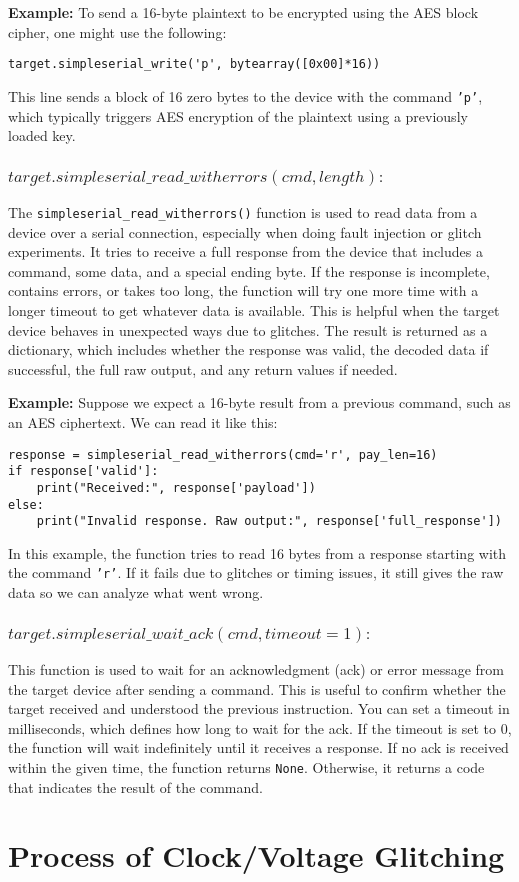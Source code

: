 \vspace{0.3cm}
\noindent
\textbf{Example:} To send a 16-byte plaintext to be encrypted using the AES block cipher, one might use the following:

\begin{verbatim}
target.simpleserial_write('p', bytearray([0x00]*16))
\end{verbatim}

This line sends a block of 16 zero bytes to the device with the command \texttt{'p'}, which typically triggers AES encryption of the plaintext using a previously loaded key.

\subsubsection{$target.simpleserial\_read\_witherrors(cmd, length) :$}
The \texttt{simpleserial\_read\_witherrors()} function is used to read data from a device over a serial connection, especially when doing fault injection or glitch experiments. It tries to receive a full response from the device that includes a command, some data, and a special ending byte. If the response is incomplete, contains errors, or takes too long, the function will try one more time with a longer timeout to get whatever data is available. This is helpful when the target device behaves in unexpected ways due to glitches. The result is returned as a dictionary, which includes whether the response was valid, the decoded data if successful, the full raw output, and any return values if needed.

\vspace{0.3cm}
\noindent
\textbf{Example:} Suppose we expect a 16-byte result from a previous command, such as an AES ciphertext. We can read it like this:

\begin{verbatim}
response = simpleserial_read_witherrors(cmd='r', pay_len=16)
if response['valid']:
    print("Received:", response['payload'])
else:
    print("Invalid response. Raw output:", response['full_response'])
\end{verbatim}

In this example, the function tries to read 16 bytes from a response starting with the command \texttt{'r'}. If it fails due to glitches or timing issues, it still gives the raw data so we can analyze what went wrong.

\subsubsection{$target.simpleserial\_wait\_ack(cmd, timeout=1) :$}
This function is used to wait for an acknowledgment (ack) or error message from the target device after sending a command. This is useful to confirm whether the target received and understood the previous instruction. You can set a timeout in milliseconds, which defines how long to wait for the ack. If the timeout is set to 0, the function will wait indefinitely until it receives a response. If no ack is received within the given time, the function returns \texttt{None}. Otherwise, it returns a code that indicates the result of the command.

\section{Process of Clock/Voltage Glitching}
